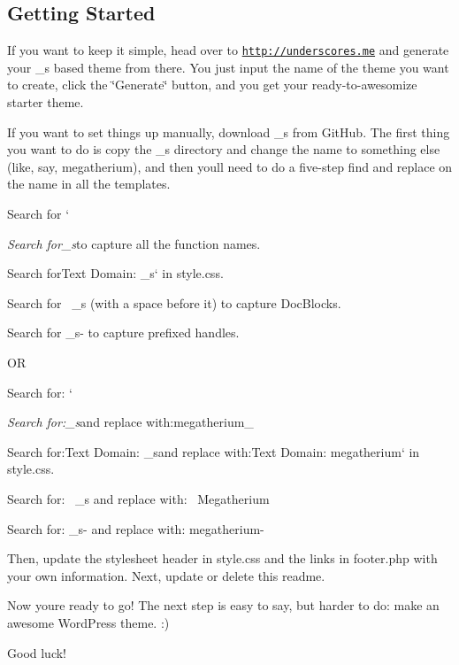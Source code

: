 \subsection*{Getting Started }

If you want to keep it simple, head over to \href{http://underscores.me}{\tt http\+://underscores.\+me} and generate your {\ttfamily \+\_\+s} based theme from there. You just input the name of the theme you want to create, click the \char`\"{}\+Generate\char`\"{} button, and you get your ready-\/to-\/awesomize starter theme.

If you want to set things up manually, download {\ttfamily \+\_\+s} from Git\+Hub. The first thing you want to do is copy the {\ttfamily \+\_\+s} directory and change the name to something else (like, say, {\ttfamily megatherium}), and then you\textquotesingle{}ll need to do a five-\/step find and replace on the name in all the templates.


\begin{DoxyEnumerate}
\item Search for `
\item {\itshape {\ttfamily Search for}\+\_\+s}{\ttfamily to capture all the function names.}
\item {\ttfamily Search for}Text Domain\+: \+\_\+s` in style.\+css.
\item Search for {\ttfamily ~\+\_\+s} (with a space before it) to capture Doc\+Blocks.
\item Search for {\ttfamily \+\_\+s-\/} to capture prefixed handles.
\end{DoxyEnumerate}

O\+R


\begin{DoxyItemize}
\item Search for\+: `
\item {\itshape {\ttfamily Search for\+:}\+\_\+s}{\ttfamily and replace with\+:}megatherium\+\_\+{\ttfamily }
\item {\ttfamily Search for\+:}Text Domain\+: \+\_\+s{\ttfamily and replace with\+:}Text Domain\+: megatherium` in style.\+css.
\item Search for\+: {\ttfamily ~\+\_\+s} and replace with\+: {\ttfamily ~Megatherium}
\item Search for\+: {\ttfamily \+\_\+s-\/} and replace with\+: {\ttfamily megatherium-\/}
\end{DoxyItemize}

Then, update the stylesheet header in {\ttfamily style.\+css} and the links in {\ttfamily footer.\+php} with your own information. Next, update or delete this readme.

Now you\textquotesingle{}re ready to go! The next step is easy to say, but harder to do\+: make an awesome Word\+Press theme. \+:)

Good luck! 